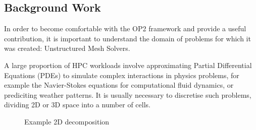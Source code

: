 \subsection{Background Work}
\label{s:bgwork}

In order to become comfortable with the OP2 framework and provide a useful contribution, it is important to understand the domain of problems for which it was created: Unstructured Mesh Solvers.
\par
A large proportion of HPC workloads involve approximating Partial Differential Equations (PDEs) to simulate complex interactions in physics problems, for example the Navier-Stokes equations for computational fluid dynamics, or prediciting weather patterns. It is usually necessary to discretise such problems, dividing 2D or 3D space into a number of cells.
\begin{figure}[h!]
  \begin{minipage}{.5\textwidth}
    \centering
  \end{minipage}
\begin{minipage}{.5\textwidth}
  \centering
  \end{minipage}
  \caption{Example 2D decomposition}
  \label{fig:2dmesh}
\end{figure}
